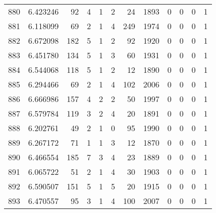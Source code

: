 \begin{tabular}{lrrrrrrrrrrr}
880 &  6.423246 &   92 &      4 &        1 &      2 &              24 &  1893 &               0 &               0 &               0 &               1 \\
881 &  6.118099 &   69 &      2 &        1 &      4 &             249 &  1974 &               0 &               0 &               0 &               1 \\
882 &  6.672098 &  182 &      5 &        1 &      2 &              92 &  1920 &               0 &               0 &               0 &               1 \\
883 &  6.451780 &  134 &      5 &        1 &      3 &              60 &  1931 &               0 &               0 &               0 &               1 \\
884 &  6.544068 &  118 &      5 &        1 &      2 &              12 &  1890 &               0 &               0 &               0 &               1 \\
885 &  6.294466 &   69 &      2 &        1 &      4 &             102 &  2006 &               0 &               0 &               0 &               1 \\
886 &  6.666986 &  157 &      4 &        2 &      2 &              50 &  1997 &               0 &               0 &               0 &               1 \\
887 &  6.579784 &  119 &      3 &        2 &      4 &              20 &  1891 &               0 &               0 &               0 &               1 \\
888 &  6.202761 &   49 &      2 &        1 &      0 &              95 &  1990 &               0 &               0 &               0 &               1 \\
889 &  6.267172 &   71 &      1 &        1 &      3 &              12 &  1870 &               0 &               0 &               0 &               1 \\
890 &  6.466554 &  185 &      7 &        3 &      4 &              23 &  1889 &               0 &               0 &               0 &               1 \\
891 &  6.065722 &   51 &      2 &        1 &      4 &              30 &  1903 &               0 &               0 &               0 &               1 \\
892 &  6.590507 &  151 &      5 &        1 &      5 &              20 &  1915 &               0 &               0 &               0 &               1 \\
893 &  6.470557 &   95 &      3 &        1 &      4 &             100 &  2007 &               0 &               0 &               0 &               1 \\

\end{tabular}

